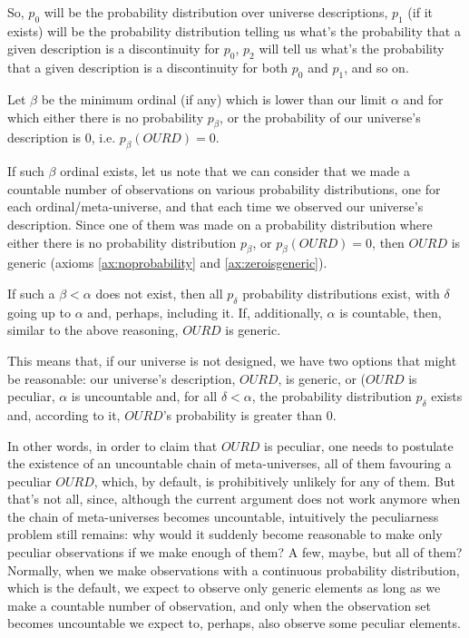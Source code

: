 \documentclass[a4paper
,draft
]{article}
\def\our_description{OURD}
\begin{document}
So, $p_0$ will be the probability distribution over universe descriptions,
$p_1$ (if it exists) will be the probability distribution telling us
what's the probability that a given description is a discontinuity for $p_0$,
$p_2$ will tell us
what's the probability that a given description is a discontinuity for both
$p_0$ and $p_1$, and so on.

Let $\beta$ be the minimum ordinal (if any) which is lower than our limit
$\alpha$ and for which either there is no probability $p_\beta$,
or the probability of our universe's description is $0$, i.e.
$p_\beta(\our_description) = 0$.

If such $\beta$ ordinal exists, let us note that we can consider that
we made a countable number of observations on various
probability distributions, one for each ordinal/meta-universe, and that
each time we observed our universe's description.
Since one of them was made on a probability distribution
where either there is no probability distribution $p_\beta$,
or $p_\beta(\our_description)=0$, then $\our_description$ is
generic (axioms \ref{ax:noprobability} and \ref{ax:zeroisgeneric}).

If such a $\beta<\alpha$ does not exist, then all $p_\delta$
probability distributions exist, with $\delta$ going up to $\alpha$ and,
perhaps, including it. If, additionally, $\alpha$ is countable, then,
similar to the above reasoning, $\our_description$ is generic.

This means that, if our universe is not designed, we have two options
that might be reasonable: our universe's description, $\our_description$, is
generic, or ($\our_description$ is peculiar, $\alpha$ is uncountable and,
for all $\delta < \alpha$,
the probability distribution $p_\delta$ exists and, according to it,
$\our_description$'s probability is greater than $0$.

In other words, in order to claim that $\our_description$ is peculiar,
one needs to postulate the
existence of an uncountable chain of meta-universes, all of them favouring a
peculiar $\our_description$, which, by default,
is prohibitively unlikely for any of them.
But that's not all, since, although the
current argument does not work anymore when the chain of
meta-universes becomes uncountable, intuitively the peculiarness problem
still remains: why would it suddenly become reasonable to make
only peculiar observations if we make enough of them? A few, maybe, but all
of them? Normally, when we make
observations with a continuous probability distribution, which is the default,
we expect to observe only generic elements as long as we make a
countable number of observation, and only when the observation set
becomes uncountable we expect to, perhaps, also observe some peculiar elements.
\end{document}
